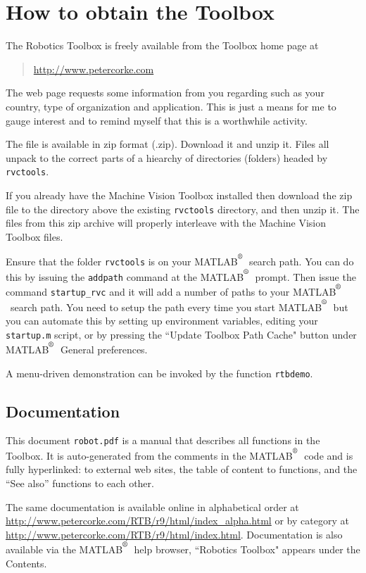 \documentclass[a4paper]{report}
\def\Mlab{MATLAB$^{\textsuperscript{\textregistered}}$}
\begin{document}
\section{How to obtain the Toolbox}
The Robotics Toolbox is freely available from the Toolbox home
page at 
\begin{quote}
\url{http://www.petercorke.com}
\end{quote}

The web page requests some information from you
regarding such as your country, type of organization and application.
This is just a means for me to gauge interest and to remind myself
that this is a worthwhile activity.

The file is available in zip format (.zip).  Download it and unzip it.
Files all unpack to the correct parts of a hiearchy of directories (folders)
headed by \texttt{rvctools}.

If you already have the Machine Vision Toolbox installed then download
the zip file to the directory above the existing \texttt{rvctools} directory,
and then unzip it.
The files from this zip archive will properly interleave with the Machine
Vision Toolbox files.

Ensure that the folder \texttt{rvctools} is on your \Mlab\ search
path.  You can do this by issuing the \texttt{addpath} command at 
the \Mlab\ prompt.
Then issue the command \texttt{startup\_rvc} and it will add a number
of paths to your \Mlab\ search path.
You need to setup the path every time you start \Mlab\ but you can 
automate this by setting up environment variables, editing your 
\texttt{startup.m} script, or by pressing the ``Update Toolbox Path
Cache" button under \Mlab\ General preferences.

A menu-driven demonstration can be invoked by the function {\tt rtbdemo}.

\subsection{Documentation}
This document {\tt robot.pdf} is a manual that describes all functions in the Toolbox.
It is auto-generated from the comments in the \Mlab\ code and is fully hyperlinked:
to external web sites, the table of content to functions, and the ``See also'' functions
to each other.

The same documentation is available online in
alphabetical order at \url{http://www.petercorke.com/RTB/r9/html/index_alpha.html}
or by category at \url{http://www.petercorke.com/RTB/r9/html/index.html}.
Documentation is also available via the \Mlab\ help browser, ``Robotics
Toolbox" appears under the Contents.
\end{document}
